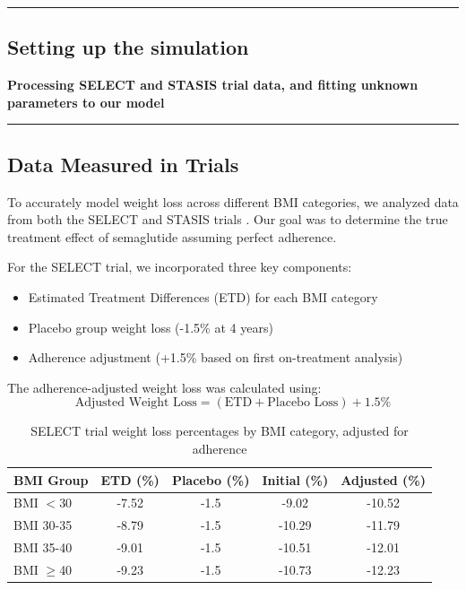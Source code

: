 {\color{gray}\hrule}
\begin{center}
\section{Setting up the simulation}
\textbf{Processing SELECT and STASIS trial data, and fitting unknown parameters to our model}
\bigskip
\end{center}
{\color{gray}\hrule}

\subsection{Data Measured in Trials}
To accurately model weight loss across different BMI categories, we analyzed data from both the SELECT and STASIS trials \cite{Ryan2024}. Our goal was to determine the true treatment effect of semaglutide assuming perfect adherence.

For the SELECT trial, we incorporated three key components:
\begin{itemize}
    \item Estimated Treatment Differences (ETD) for each BMI category
    \item Placebo group weight loss (-1.5\% at 4 years)
    \item Adherence adjustment (+1.5\% based on first on-treatment analysis)
\end{itemize}

The adherence-adjusted weight loss was calculated using:
\begin{equation}
    \text{Adjusted Weight Loss} = (\text{ETD} + \text{Placebo Loss}) + 1.5\%
\end{equation}

\begin{table}[h]
\centering
\begin{tabular}{|l|c|c|c|c|}
\hline
\textbf{BMI Group} & \textbf{ETD (\%)} & \textbf{Placebo (\%)} & \textbf{Initial (\%)} & \textbf{Adjusted (\%)} \\
\hline
BMI $<$30 & -7.52 & -1.5 & -9.02 & -10.52 \\
BMI 30-35 & -8.79 & -1.5 & -10.29 & -11.79 \\
BMI 35-40 & -9.01 & -1.5 & -10.51 & -12.01 \\
BMI $\geq$40 & -9.23 & -1.5 & -10.73 & -12.23 \\
\hline
\end{tabular}
\caption{SELECT trial weight loss percentages by BMI category, adjusted for adherence}
\end{table}

